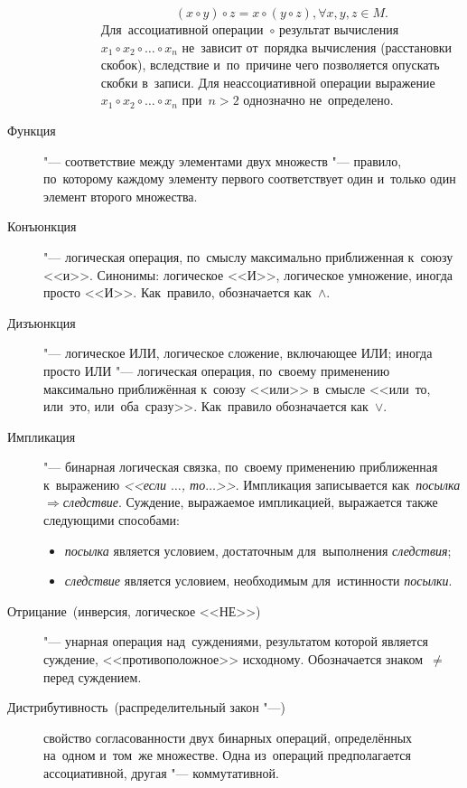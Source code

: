 \documentclass[]{scrartcl}
\begin{document}
\begin{description}
\begin{itemize}
\begin{description}
\begin{equation}
		(x \circ y) \circ z = x \circ (y \circ z), \forall x,y,z \in M.
		\end{equation}
		Для~ассоциативной операции~${\textstyle \circ }$ результат вычисления ${\textstyle x_{1} \circ x_{2}\circ \ldots \circ x_{n}}$ не~зависит от~порядка вычисления (расстановки скобок), вследствие и~по~причине чего позволяется опускать скобки в~записи. Для неассоциативной операции выражение ${\textstyle x_{1} \circ x_{2} \circ \ldots \circ x_{n}}$ при~${\textstyle n>2}$ однозначно не~определено.
	\end{description}
\end{itemize}
	\item[Функция] "--- соответствие между элементами двух множеств "--- правило, по~которому каждому элементу первого соответствует один и~только один элемент второго множества.
	\item[Конъюнкция] "--- логическая операция, по~смыслу максимально приближенная к~союзу <<и>>. Синонимы: логическое <<И>>, логическое  умножение, иногда просто <<И>>. Как~правило, обозначается как~${\textstyle \wedge}$.
	\item[Дизъюнкция] "--- логическое ИЛИ, логическое сложение, включающее ИЛИ; иногда просто ИЛИ "--- логическая операция, по~своему применению максимально приближённая к~союзу <<или>> в~смысле <<или~то, или~это, или~оба~сразу>>. Как~правило обозначается как~${\textstyle \vee}$.
	\item[Импликация] "--- бинарная логическая связка, по~своему применению приближенная к~выражению \emph{<<если $\ldots$, то$\ldots$>>}. Импликация записывается как~\emph{посылка}${\textstyle \Rightarrow}$\emph{следствие}. Суждение, выражаемое импликацией, выражается также следующими способами:
		\begin{itemize}
			\item \emph{посылка} является условием, достаточным для~выполнения \emph{следствия};
			\item \emph{следствие} является условием, необходимым для~истинности \emph{посылки}.
		\end{itemize} 
	\item[Отрицание~(инверсия, логическое <<НЕ>>)] "--- унарная операция над~суждениями, результатом которой является суждение, <<противоположное>> исходному. Обозначается знаком~${\textstyle \neq}$ перед суждением.
	\item[Дистрибутивность~(распределительный закон "---)] свойство согласованности двух бинарных операций, определённых на~одном и~том~же множестве. Одна из~операций предполагается ассоциативной, другая "--- коммутативной. 

\end{description}
\end{document}
